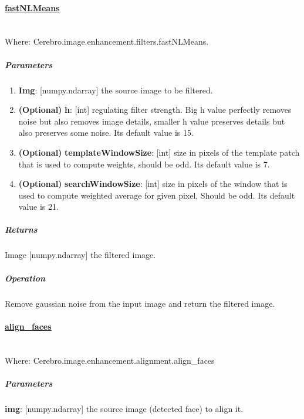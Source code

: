\paragraph{\underline{fastNLMeans}} \mbox{} \\
Where: Cerebro.image.enhancement.filters.fastNLMeans.
\subparagraph{Parameters}
\begin{changemargin}{0.5cm}{0cm}
	\begin{enumerate} 
		\item \textbf{Img}: [numpy.ndarray] the source image to be filtered.
		\item \textbf{(Optional)} \textbf{h}: [int] regulating filter strength. Big h value perfectly removes noise but also removes image details, smaller h value preserves details but also preserves some noise. Its default value is 15.
		\item \textbf{(Optional)} \textbf{templateWindowSize}: [int] size in pixels of the template patch that is used to compute weights, should be odd. \newline Its default value is 7.
		\item \textbf{(Optional)} \textbf{searchWindowSize}: [int] size in pixels of the window that is used to compute weighted average for given pixel, Should be odd. \newline Its default value is 21.
	\end{enumerate}
\end{changemargin}

\subparagraph{Returns}
\begin{changemargin}{1cm}{0cm}
	Image [numpy.ndarray] the filtered image.
\end{changemargin}

\subparagraph{Operation}
\begin{changemargin}{1cm}{0cm}
	Remove gaussian noise from the input image and return the filtered image.
\end{changemargin}
\hrulefill

\paragraph{\underline{align\_faces}} \mbox{} \\
Where: Cerebro.image.enhancement.alignment.align\_faces
\subparagraph{Parameters}
\begin{changemargin}{1cm}{0cm}
	\textbf{img}: [numpy.ndarray] the source image (detected face) to align it.
\end{changemargin}

